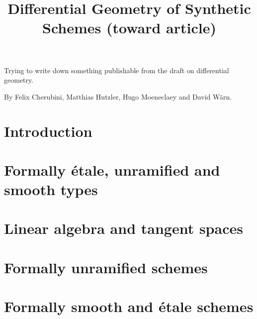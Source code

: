 \documentclass{../util/zariski}
\title{Differential Geometry of Synthetic Schemes (toward article)}
\begin{document}
\maketitle

Trying to write down something publishable from the draft on differential geometry.

By Felix Cherubini, Matthias Hutzler, Hugo Moeneclaey and David Wärn.






\tableofcontents

\section*{Introduction}


\section{Formally étale, unramified and smooth types}


\section{Linear algebra and tangent spaces}


\section{Formally unramified schemes}


\section{Formally smooth and étale schemes}



\printindex

\printbibliography
\end{document}
